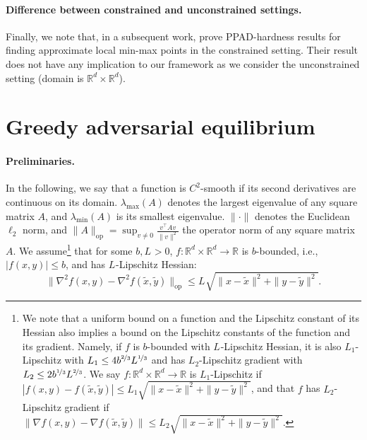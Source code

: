 \documentclass[11pt,letterpaper]{article}
\begin{document}
\vspace{-3mm}
\paragraph{Difference between constrained and unconstrained settings.}
%
Finally, we note that, in a subsequent work, \cite{daskalakis2020complexity} prove PPAD-hardness results for finding approximate local min-max points in the constrained setting.
%
Their result does not have any implication to our framework as we consider the unconstrained setting (domain is $\mathbb{R}^d \times \mathbb{R}^d$).
 




\section{Greedy adversarial equilibrium} \label{sec_Greedy_Definitions}
%
\paragraph{Preliminaries.}
%
%
 In the following,  we say that a function is $C^2$-smooth if its second derivatives are continuous on its domain.
  $\lambda_{\mathrm{max}}(A)$ denotes the largest eigenvalue of any square matrix $A$, and $\lambda_{\mathrm{min}}(A)$ is its smallest eigenvalue.  
   $\| \cdot \|$ denotes the Euclidean $\ell_2$ norm, and $\|A\|_{\mathrm{op}} = \sup_{v \neq 0} \frac{v^\top A v}{\|v\|^{2}} $ the operator norm of any square matrix $A$. 
%
We assume\footnote{We note that a uniform bound on a function and the Lipschitz constant of its Hessian also implies a bound on the Lipschitz constants of the function and its gradient.
%
Namely, if $f$ is $b$-bounded with $L_{}$-Lipschitz Hessian, it is also $L_1$-Lipschitz with  $L_1 \leq 4 b^{\nicefrac{2}{3}} L^{\nicefrac{1}{3}}$ and has $L_2$-Lipschitz gradient with $L_2 \leq 2 b^{\nicefrac{1}{3}} L_{}^{\nicefrac{2}{3}}$.
%
 We say $f: \mathbb{R}^d \times \mathbb{R}^d \rightarrow \mathbb{R}$ is $L_1$-Lipschitz if $|f(x,y) -  f(\tilde{x},\tilde{y})| \leq L_1 \sqrt{\| x- \tilde{x}\|^2 + \| y- \tilde{y}\|^2}$, and that $f$ has $L_2$-Lipschitz gradient if $\|\nabla f(x,y) - \nabla f(\tilde{x},\tilde{y})\| \leq L_2 \sqrt{\| x- \tilde{x}\|^2 + \| y- \tilde{y}\|^2}$.} that for some $b, L_{}>0$,  $f:\mathbb{R}^d \times \mathbb{R}^d \rightarrow \mathbb{R}$ is $b$-bounded, i.e.,  $|f(x,y)| \leq b$, and has $L_{}$-Lipschitz Hessian: $$\|\nabla^2 f(x,y) - \nabla^2 f(\tilde{x},\tilde{y})\|_{\mathrm{op}} \leq L_{} \sqrt{\| x- \tilde{x}\|^2 + \| y- \tilde{y}\|^2}.$$
%
\end{document}

